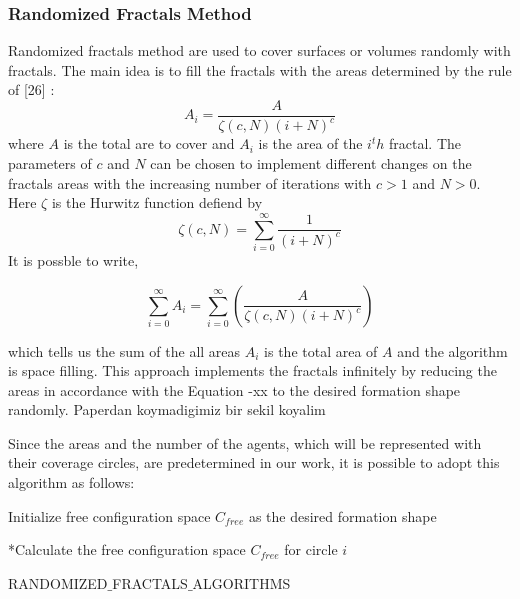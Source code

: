\documentclass[twoside]{article}
\begin{document}
			\subsubsection{Randomized Fractals Method}
Randomized fractals method are used to cover surfaces or volumes randomly with fractals. The main idea is to fill the fractals with the areas determined by the rule of [26] :
\begin{equation}
  A_i = \frac{A}{\zeta(c,N)(i+N)^c}
\end{equation}
	where $A$ is the total are to cover and $A_i$ is the area of the $i^th$ fractal. The parameters of $c$ and $N$ can be chosen to implement different changes on the fractals areas with the increasing number of iterations with $c>1$ and $N>0$. Here  $\zeta$ is the Hurwitz function defiend by
	\begin{equation}
  \zeta(c,N) = \sum_{i=0}^{\infty} \frac{1}{(i+N)^c}
	\end{equation}
	It is possble to write, 
	
		\begin{equation}
		\sum_{i=0}^{\infty}A_i = \sum_{i = 0}^{\infty}\left(\frac{A}{\zeta(c,N)(i+N)^c}\right)
		\end{equation}
	
		which tells us the sum of the all areas $A_i$ is the total area of $A$ and the algorithm is space filling. This approach implements the fractals infinitely by reducing the areas in accordance with the Equation -xx to the desired formation shape randomly. 
		Paperdan koymadigimiz bir sekil koyalim
		
		Since the areas and the number of the agents, which will be represented with their coverage circles, are predetermined in our work, it is possible to adopt this algorithm as follows:
		
					\begin{algorithm}[H]
						
						Initialize free configuration space $C_{free}$ as the desired formation shape
						
						{		
							*Calculate the free configuration space $C_{free}$ for circle $i$\;
												
						}												
						
						\caption{RANDOMIZED$\_$FRACTALS$\_$ALGORITHMS}
					\end{algorithm}
	
\end{document}
